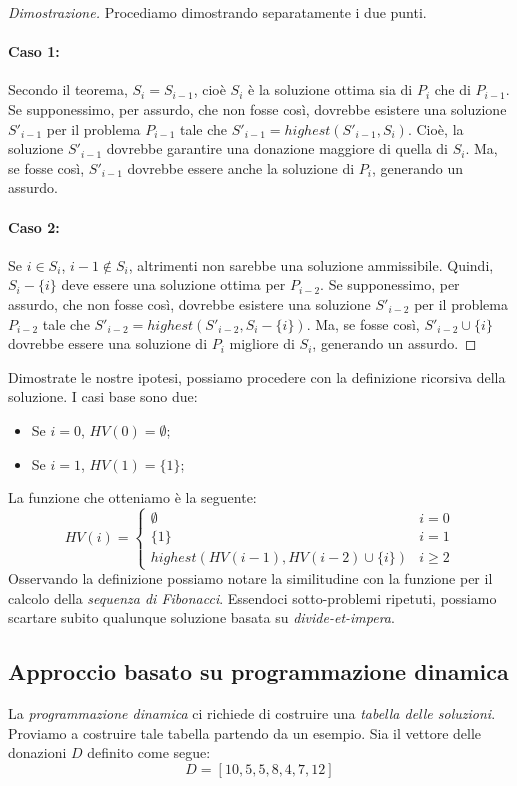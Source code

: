 \begin{proof}[Dimostrazione]
    Procediamo dimostrando separatamente i due punti.
    \paragraph{Caso 1: }
    Secondo il teorema, $S_i=S_{i-1}$, cioè $S_i$ è la soluzione ottima sia di
    $P_i$ che di $P_{i-1}$. Se supponessimo, per assurdo, che non fosse così,
    dovrebbe esistere una soluzione $S'_{i-1}$ per il problema $P_{i-1}$ tale
    che $S'_{i-1}=highest\left(S'_{i-1}, S_i\right)$. Cioè, la soluzione $S'_{i-1}$
    dovrebbe garantire una donazione maggiore di quella di $S_i$. Ma, se fosse
    così, $S'_{i-1}$ dovrebbe essere anche la soluzione di $P_i$, generando un
    assurdo.

    \paragraph{Caso 2: }
    Se $i\in S_i$, $i-1\notin S_i$, altrimenti non sarebbe una soluzione
    ammissibile. Quindi, $S_i-\{i\}$ deve essere una soluzione ottima per
    $P_{i-2}$. Se supponessimo, per assurdo, che non fosse così, dovrebbe
    esistere una soluzione $S'_{i-2}$ per il problema $P_{i-2}$ tale che
    $S'_{i-2}=highest\left(S'_{i-2}, S_i-\{i\}\right)$. Ma, se fosse così,
    $S'_{i-2}\cup\{i\}$ dovrebbe essere una soluzione di $P_i$ migliore di
    $S_i$, generando un assurdo.
\end{proof}\noindent
Dimostrate le nostre ipotesi, possiamo procedere con la definizione ricorsiva
della soluzione. I casi base sono due:
\begin{itemize}
    \item Se $i=0$, $HV(0)=\emptyset$;
    \item Se $i=1$, $HV(1)=\{1\}$;
\end{itemize}
La funzione che otteniamo è la seguente:
\[HV(i)=\begin{cases}
    \emptyset & i=0\\
    \{1\} & i=1\\
    highest\left(HV(i-1), HV(i-2)\cup\{i\}\right) & i\geq2
\end{cases}\]
Osservando la definizione possiamo notare la similitudine con la funzione per il
calcolo della \emph{sequenza di Fibonacci}. Essendoci sotto-problemi ripetuti,
possiamo scartare subito qualunque soluzione basata su \emph{divide-et-impera}.

\subsection{Approccio basato su programmazione dinamica}
La \emph{programmazione dinamica} ci richiede di costruire una \emph{tabella
delle soluzioni}. Proviamo a costruire tale tabella partendo da un esempio.
Sia il vettore delle donazioni $D$ definito come segue:
\[D=[10,5,5,8,4,7,12]\]

